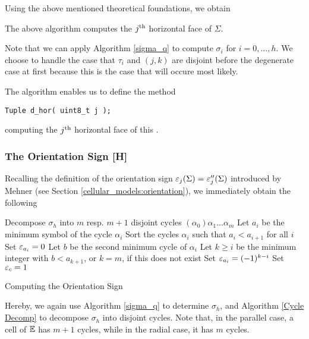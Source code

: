 Using the above mentioned theoretical foundations, we obtain

\begin{prop}
The above algorithm computes the $j^{\text{th}}$ horizontal face of $\Sigma$.
\end{prop}

Note that we can apply Algorithm \ref{sigma_q} to compute $\sigma_i$ for $i = 0, \dotsc, h$.
We choose to handle the case that $\tau_i$ and $(j, k)$ are disjoint before the degenerate case at first
because this is the case that will occure most likely.

The algorithm enables us to define the method
\begin{lstlisting}
Tuple d_hor( uint8_t j );
\end{lstlisting}
computing the $j^{\text{th}}$ horizontal face of this .

\subsubsection{The Orientation Sign [H]}\label{program:kappa:tuple:orientation_sign}

Recalling the definition of the orientation sign $\varepsilon_j(\Sigma) = \varepsilon_j''(\Sigma)$ introduced by Mehner (see Section \ref{cellular_models:orientation}), 
we immediately obtain the following

\begin{algorithm}[H]
\label{orientation_sign}
\DontPrintSemicolon
{}


Decompose $\sigma_h$ into $m$ resp. $m+1$ disjoint cycles $(\alpha_0) \alpha_1 \dotsc \alpha_m$ \;
Let $a_i$ be the minimum symbol of the cycle $\alpha_i$\;
Sort the cycles $\alpha_i$ such that $a_i < a_{i+1}$ for all $i$\;
{
  {
    Set $\varepsilon_{a_i} = 0$\;
  }
  Let $b$ be the second minimum cycle of $\alpha_i$\;
  Let $k \geq i$ be the minimum integer with $b < a_{k+1}$, or $k = m$, if this does not exist\;
  Set $\varepsilon_{a_i} = (-1)^{k - i}$\;
  {
    Set $\varepsilon_c = 1$\;
  }
}

\caption{Computing the Orientation Sign}

\end{algorithm}

Hereby, we again use Algorithm \ref{sigma_q} to determine $\sigma_h$, 
and Algorithm \ref{Cycle Decomp} to decompose $\sigma_h$ into disjoint cycles.
Note that, in the parallel case, a cell of $\mathbb E$ has $m+1$ cycles, while in the radial case, it has $m$ cycles.

